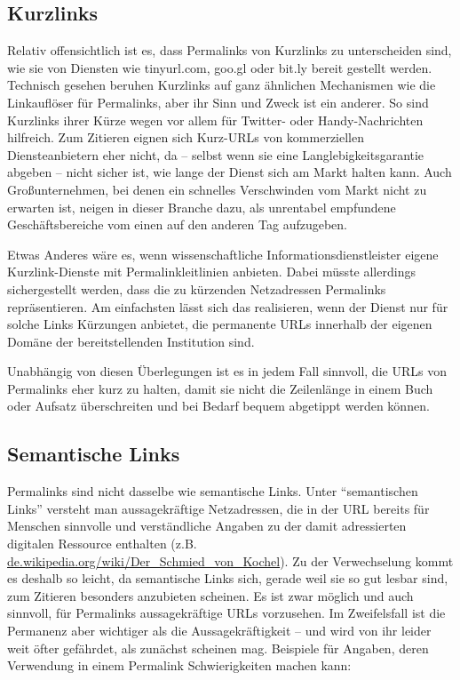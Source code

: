 \documentclass[12pt, a4paper]{article}
\begin{document}
\subsection{Kurzlinks}
\label{kurzlinks}

Relativ offensichtlich ist es, dass Permalinks von Kurzlinks zu
unterscheiden sind, wie sie von Diensten wie tinyurl.com, goo.gl oder
bit.ly bereit gestellt werden. Technisch gesehen beruhen Kurzlinks auf
ganz ähnlichen Mechanismen wie die Linkauflöser für Permalinks, aber
ihr Sinn und Zweck ist ein anderer. So sind Kurzlinks ihrer Kürze
wegen vor allem für Twitter- oder Handy-Nachrichten hilfreich. Zum
Zitieren eignen sich Kurz-URLs von kommerziellen Diensteanbietern eher
nicht, da -- selbst wenn sie eine Langlebigkeitsgarantie abgeben --
nicht sicher ist, wie lange der Dienst sich am Markt halten kann. Auch
Großunternehmen, bei denen ein schnelles Verschwinden vom Markt nicht
zu erwarten ist, neigen in dieser Branche dazu, als unrentabel
empfundene Geschäftsbereiche vom einen auf den anderen Tag aufzugeben.

Etwas Anderes wäre es, wenn wissenschaftliche Informationsdienstleister
eigene Kurzlink-Dienste mit Permalinkleitlinien anbieten. Dabei
müsste allerdings sichergestellt werden, dass die zu kürzenden
Netzadressen Permalinks repräsentieren. Am einfachsten lässt sich das
realisieren, wenn der Dienst nur für solche Links Kürzungen anbietet, die permanente URLs
innerhalb der eigenen Domäne der bereitstellenden Institution
sind.

Unabhängig von diesen Überlegungen ist es in jedem Fall
sinnvoll, die URLs von Permalinks eher kurz zu halten, damit sie nicht
die Zeilenlänge in einem Buch oder Aufsatz überschreiten und
bei Bedarf bequem abgetippt werden können.

\subsection{Semantische Links}
\label{semantische-links}

Permalinks sind nicht dasselbe wie semantische Links. Unter
"`semantischen Links"' versteht man aussagekräftige Netzadressen, die
in der URL bereits für Menschen sinnvolle und verständliche Angaben zu
der damit adressierten digitalen Ressource enthalten (z.B.
\href{https://de.wikipedia.org/wiki/Der_Schmied_von_Kochel}{de.\-wikipedia.\-org/\-wiki/\-Der\_Schmied\_von\_Kochel}).
Zu der Verwechselung kommt es deshalb so leicht, da semantische Links
sich, gerade weil sie so gut lesbar sind, zum Zitieren besonders
anzubieten scheinen. Es ist zwar möglich und auch sinnvoll, für
Permalinks aussagekräftige URLs vorzusehen. Im Zweifelsfall ist die
Permanenz aber wichtiger als die Aussagekräftigkeit -- und wird von
ihr leider weit öfter gefährdet, als zunächst scheinen mag. Beispiele
für Angaben, deren Verwendung in einem Permalink Schwierigkeiten
machen kann:
\end{document}
